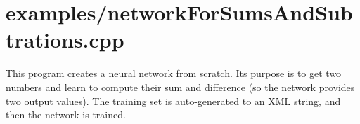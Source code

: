 \section{examples/networkForSumsAndSubtrations.cpp}
This program creates a neural network from scratch. Its purpose is to get two numbers and learn to compute their sum and difference (so the network provides two output values). The training set is auto-generated to an XML string, and then the network is trained.



\begin{DocInclude}\begin{verbatim}\end{verbatim}
\end{DocInclude}
 